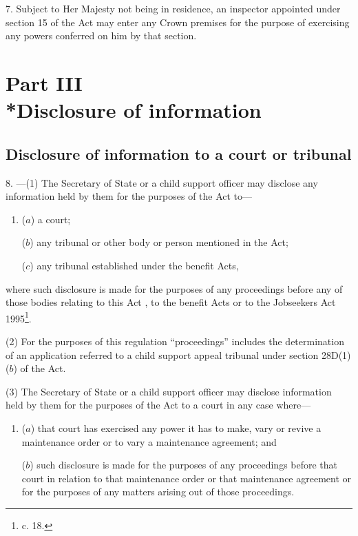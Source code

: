 \documentclass[a4paper,12pt]{article}
\begin{document}
7.  Subject to Her Majesty not being in residence, an inspector appointed under section 15 of the Act may enter any Crown premises for the purpose of exercising any powers conferred on him by that section.

\section[Part III --- Disclosure of information]{Part III\\*Disclosure of information}

\renewcommand\parthead{--- Part III}

\subsection[8. Disclosure of information to a court or tribunal]{Disclosure of information to a court or tribunal}

8.%
---(1)  %
  The Secretary of State or a child support officer may disclose any information held by them for the purposes of the Act to—
\begin{enumerate}\item[]
($a$) a court;

($b$) any tribunal or other body or person mentioned in the Act;

($c$) any tribunal established under the benefit Acts,
\end{enumerate}
where such disclosure is made for the purposes of any proceedings before any of those bodies relating to this Act%
, to the benefit Acts or to the Jobseekers Act 1995\footnote{ c. 18.}.  %

(2) For the purposes of this regulation “proceedings” includes the determination of an application referred to a child support appeal tribunal under section 28D(1)($b$) of the Act.

(3) The Secretary of State or a child support officer may disclose information held by them for the purposes of the Act to a court in any case where—
\begin{enumerate}\item[]
($a$) that court has exercised any power it has to make, vary or revive a maintenance order or to vary a maintenance agreement; and

($b$) such disclosure is made for the purposes of any proceedings before that court in relation to that maintenance order or that maintenance agreement or for the purposes of any matters arising out of those proceedings.
\end{enumerate}
\end{document}
